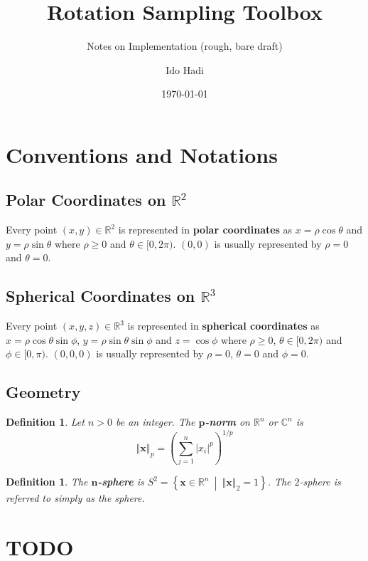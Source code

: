 \documentclass[a4paper,11pt]{scrartcl}
\title{Rotation Sampling Toolbox}
\subtitle{Notes on Implementation (rough, bare draft)}
\date{\today}
\author{Ido Hadi}
\newcommand{\F}[1][R]{\mathbb{#1}}
\newcommand{\Ltwonorm}[1]{\left\Vert #1 \right\Vert}
\newcommand{\setsep}{\ \middle|\ }
\newcounter{cnt}
\newtheorem{definition1}[cnt]{Definition}
\begin{document}
	\maketitle
	
	\tableofcontents
	
	\section{Conventions and Notations}
	
	\subsection{Polar Coordinates on $ \F^{2} $}
	Every point $ (x,y) \in \F^{2} $ is represented in \textbf{polar coordinates} as $ x = \rho \cos \theta $ and $ y = \rho \sin \theta $ where $ \rho \ge 0 $ and $ \theta \in [0, 2 \pi) $. $ (0,0) $ is usually represented by $ \rho = 0 $ and $ \theta = 0 $.
	
	\subsection{Spherical Coordinates on $ \F^{3} $}
	Every point $ (x,y,z) \in \F^{3} $ is represented in \textbf{spherical coordinates} as $ x = \rho \cos \theta \sin \phi $, $ y = \rho \sin \theta \sin \phi $ and $ z = \cos \phi  $ where $ \rho \ge 0 $, $ \theta \in [0, 2 \pi) $ and $ \phi \in [0, \pi ) $. $ (0,0,0) $ is usually represented by $ \rho = 0 $, $ \theta = 0 $ and $ \phi = 0 $.
	
	\subsection{Geometry}
	
	\begin{definition1}
		Let $ n > 0 $ be an integer. The \textbf{$ \bm{p} $-norm} on $ \F^{n} $ or $ \F[C]^{n} $ is
		\begin{equation*}
		\Ltwonorm{\mathbf{x}}_{p}
		= \left( \sum_{j=1}^{n} \left|x_i\right|^{p} \right)^{1/p}
		\end{equation*}
	\end{definition1}
	
	\begin{definition1}
		The \textbf{$ \bm{n} $-sphere} is $ S^2 = \left\{ \mathbf{x} \in \F^{n} \setsep \Ltwonorm{\mathbf{x}}_2 = 1 \right\} $. The $ 2 $-sphere is referred to simply as the sphere.
	\end{definition1}
	
	\section{TODO}
	
	\printbibliography
	
\end{document}
